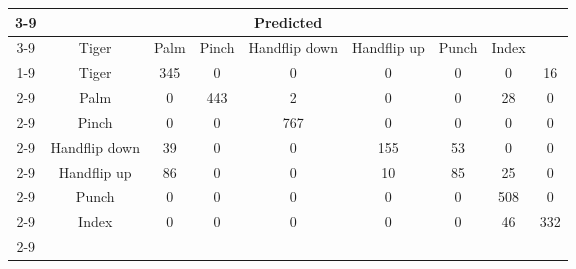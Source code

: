 \documentclass{standalone}
\begin{document}
 
 \begin{tabular}{|c |c |c |c |c |c |c |c |c |}
\cline{3-9}\multicolumn{2}{c|}{} & \multicolumn{7}{c|}{Predicted} \\ 
\cline{3-9} \multicolumn{2}{c |}{ } & Tiger & Palm & Pinch & Handflip down & Handflip up & Punch & Index\\ 
\cline{1-9}\multirow{7}{*}{\rotatebox[origin=c]{90}{Actual}} & Tiger & 345 & 0 & 0 & 0 & 0 & 0 & 16\\ 
 \cline{2-9} & Palm & 0 & 443 & 2 & 0 & 0 & 28 & 0\\ 
 \cline{2-9} & Pinch & 0 & 0 & 767 & 0 & 0 & 0 & 0\\ 
 \cline{2-9} & Handflip down & 39 & 0 & 0 & 155 & 53 & 0 & 0\\ 
 \cline{2-9} & Handflip up & 86 & 0 & 0 & 10 & 85 & 25 & 0\\ 
 \cline{2-9} & Punch & 0 & 0 & 0 & 0 & 0 & 508 & 0\\ 
 \cline{2-9} & Index & 0 & 0 & 0 & 0 & 0 & 46 & 332\\ 
 \cline{2-9}\hline \end{tabular}
 
\end{document}
